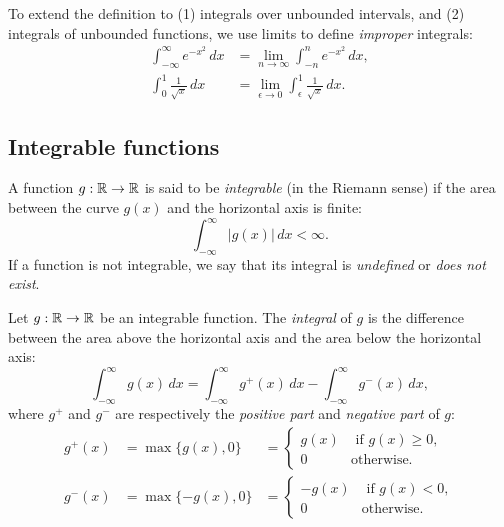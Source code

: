 %

To extend the definition to (1) integrals over unbounded intervals, and (2) integrals of unbounded functions, we use limits to define \emph{improper} integrals:
\begin{align*}
\int_{-\infty}^{\infty} e^{-x^2}\,dx 		& = \lim_{n\to\infty} \int_{-n}^{n} e^{-x^2}\,dx, \\[2ex]
\int_0^1 \frac{1}{\sqrt{x}}\,dx			& = \lim_{\epsilon\to 0} \int_{\epsilon}^1 \frac{1}{\sqrt{x}}\,dx.
\end{align*}

\subsection{Integrable functions}

A function $g:\mathbb{R}\to\mathbb{R}$ is said to be \emph{integrable} (in the Riemann sense) if the area between the curve $g(x)$ and the horizontal axis is finite:
\[
\int_{-\infty}^{\infty} |g(x)|\,dx < \infty.
\]
If a function is not integrable, we say that its integral is \emph{undefined} or \emph{does not exist}.

\bigskip
Let $g:\mathbb{R}\to\mathbb{R}$ be an integrable function. The \emph{integral} of $g$ is the difference between the area above the horizontal axis and the area below the horizontal axis:
\[
\int_{-\infty}^{\infty} g(x)\,dx = \int_{-\infty}^{\infty} g^{+}(x)\,dx  - \int_{-\infty}^{\infty} g^{-}(x)\,dx,
\]
where $g^{+}$ and $g^{-}$ are respectively the \emph{positive part} and \emph{negative part} of $g$: 
\[\begin{array}{lll}
g^{+}(x)	& = \max\{ g(x),0\} & = \begin{cases}  g(x) & \text{ if } g(x)\geq 0, \\ 0 & \text{otherwise.}\end{cases} \\[3ex]
g^{-}(x)	& = \max\{-g(x),0\} & = \begin{cases} -g(x) & \text{ if } g(x)<0, \\ 0 & \text{otherwise.}\end{cases}
\end{array}\]

